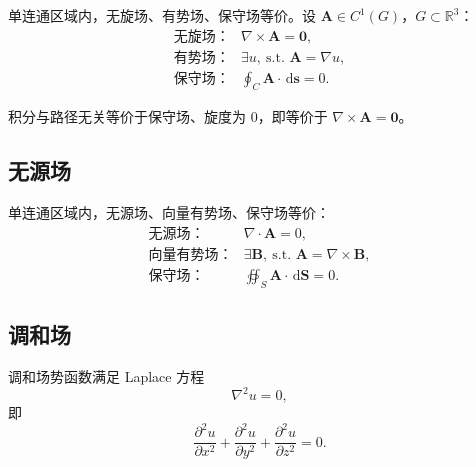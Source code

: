 \documentclass[UTF8,fontset=fandol,zihao=5]{ctexart}
\newcommand{\RR}{\mathbb{R}}
\newcommand{\dd}{\,\mathrm{d}}
\let\bm\boldsymbol
\begin{document}
单连通区域内，无旋场、有势场、保守场等价。设 $\bm A\in C^1(G)$，$G\subset\RR^3$：
\[
\begin{array}{ll}
\text{无旋场：}&\nabla\times\bm A=\bm0,\\
\text{有势场：}&\exists u,\ \text{s.t. }\bm A=\nabla u,\\
\text{保守场：}&\displaystyle\oint_C\bm A\cdot\dd\bm s=0.
\end{array}
\]

积分与路径无关等价于保守场、旋度为 $0$，即等价于 $\nabla\times\bm A=\bm0$。

\subsection{无源场}

单连通区域内，无源场、向量有势场、保守场等价：
\[
\begin{array}{ll}
\text{无源场：}&\nabla\cdot\bm A=0,\\
\text{向量有势场：}&\exists\bm B,\ \text{s.t. }\bm A=\nabla\times\bm B,\\
\text{保守场：}&\displaystyle\oiint_S\bm A\cdot\dd\bm S=0.
\end{array}
\]

\subsection{调和场}

调和场势函数满足 Laplace 方程
\[
\nabla^2u=0,
\]
即
\[
\frac{\partial^2u}{\partial x^2}
+\frac{\partial^2u}{\partial y^2}
+\frac{\partial^2u}{\partial z^2}=0.
\]
\end{document}
